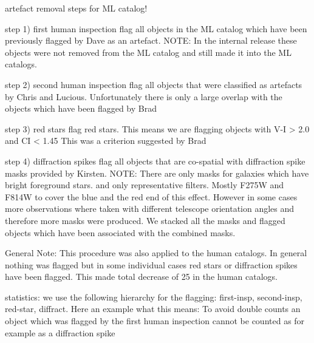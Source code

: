 artefact removal steps for ML catalog! 


step 1) first human inspection
flag all objects in the ML catalog which have been previously flagged by Dave as an artefact.
NOTE: In the internal release these objects were not removed from the ML catalog and still made it into the ML catalogs.

step 2) second human inspection
flag all objects that were classified as artefacts by Chris and Lucious. Unfortunately there is only a large overlap with the objects which have been flagged by Brad

step 3) red stars
flag red stars. This means we are flagging objects with V-I > 2.0 and CI < 1.45 This was a criterion suggested by Brad

step 4) diffraction spikes
flag all objects that are co-spatial with diffraction spike masks provided by Kirsten. 
NOTE: There are only masks for galaxies which have bright foreground stars. and only representative filters. Mostly F275W and F814W to cover the blue and the red end of this effect. However in some cases more observations where taken with different telescope orientation angles and therefore more masks were produced. We stacked all the masks and flagged objects which have been associated with the combined masks.


General Note: This procedure was also applied to the human catalogs. In general nothing was flagged but in some individual cases red stars or diffraction spikes have been flagged. This made total decrease of 25 in the human catalogs.



statistics: 
we use the following hierarchy for the flagging: first-insp, second-insp, red-star, 
diffract. Here an example what this means: To avoid double counts an object which was flagged by the first human inspection cannot be counted as for example as a diffraction spike 

